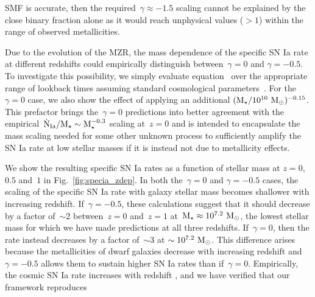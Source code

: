 \documentclass[foo.tex]{subfiles}
\begin{document}
SMF is accurate, then the required~$\gamma \approx -1.5$ scaling cannot be
explained by the close binary fraction alone as it would reach unphysical
values ($>1$) within the range of observed metallicities.
\par
Due to the evolution of the MZR, the mass dependence of the specific SN Ia rate
at different redshifts could empirically distinguish between~$\gamma = 0$ and
$\gamma = -0.5$.
To investigate this possibility, we simply evaluate equation~
over the appropriate range of lookback times assuming standard cosmological
parameters~\citep{Planck2014}.
For the~$\gamma = 0$ case, we also show the effect of applying an additional
$(\text{M}_\star / 10^{10}~\text{M}_\odot)^{-0.15}$.
This prefactor brings the~$\gamma = 0$ predictions into better agreement with
the empirical~$\dot{\text{N}}_\text{Ia} / \text{M}_\star \sim \text{M}_\star^{-0.3}$ scaling
at~$z = 0$ and is intended to encapsulate the mass scaling needed for some
other unknown process to sufficiently amplify the SN Ia rate at low stellar
masses if it is instead not due to metallicity effects.
\par
We show the resulting specific SN Ia rates as a function of stellar mass at
$z = 0$,~$0.5$ and~$1$ in Fig.~\ref{fig:specia_zdep}.
In both the~$\gamma = 0$ and $\gamma = -0.5$ cases, the scaling of the specific
SN Ia rate with galaxy stellar mass becomes shallower with increasing redshift.
If~$\gamma = -0.5$, these calculations suggest that it should decrease by a
factor of~$\sim$2 between~$z = 0$ and~$z = 1$ at~$\text{M}_\star \approx
10^{7.2}~\text{M}_\odot$, the lowest stellar mass for which we have made predictions at
all three redshifts.
If~$\gamma = 0$, then the rate instead decreases by a factor of~$\sim$3 at
$\sim 10^{7.2}~\text{M}_\odot$.
This difference arises because the metallicities of dwarf galaxies decrease
with increasing redshift and~$\gamma = -0.5$ allows them to sustain higher
SN Ia rates than if~$\gamma = 0$.
Empirically, the cosmic SN Ia rate increases with redshift
\citep[e.g.][]{Graur2014}, and we have verified that our framework reproduces
\end{document}
